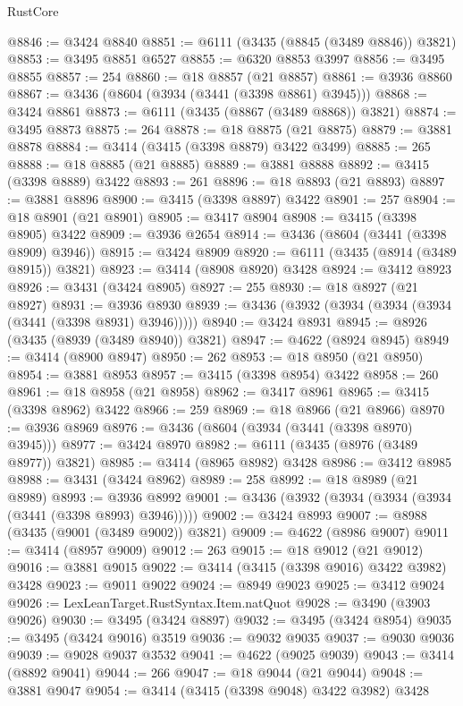 \begin{lexlean}{RustCore}
\begin{coremodule}
@8846 := @3424 @8840
@8851 := @6111 (@3435 (@8845 (@3489 @8846)) @3821)
@8853 := @3495 @8851 @6527
@8855 := @6320 @8853 @3997
@8856 := @3495 @8855
@8857 := 254
@8860 := @18 @8857 (@21 @8857)
@8861 := @3936 @8860
@8867 := @3436 (@8604 (@3934 (@3441 (@3398 @8861) @3945)))
@8868 := @3424 @8861
@8873 := @6111 (@3435 (@8867 (@3489 @8868)) @3821)
@8874 := @3495 @8873
@8875 := 264
@8878 := @18 @8875 (@21 @8875)
@8879 := @3881 @8878
@8884 := @3414 (@3415 (@3398 @8879) @3422 @3499)
@8885 := 265
@8888 := @18 @8885 (@21 @8885)
@8889 := @3881 @8888
@8892 := @3415 (@3398 @8889) @3422
@8893 := 261
@8896 := @18 @8893 (@21 @8893)
@8897 := @3881 @8896
@8900 := @3415 (@3398 @8897) @3422
@8901 := 257
@8904 := @18 @8901 (@21 @8901)
@8905 := @3417 @8904
@8908 := @3415 (@3398 @8905) @3422
@8909 := @3936 @2654
@8914 := @3436 (@8604 (@3441 (@3398 @8909) @3946))
@8915 := @3424 @8909
@8920 := @6111 (@3435 (@8914 (@3489 @8915)) @3821)
@8923 := @3414 (@8908 @8920) @3428
@8924 := @3412 @8923
@8926 := @3431 (@3424 @8905)
@8927 := 255
@8930 := @18 @8927 (@21 @8927)
@8931 := @3936 @8930
@8939 := @3436 (@3932 (@3934 (@3934 (@3934 (@3441 (@3398 @8931) @3946)))))
@8940 := @3424 @8931
@8945 := @8926 (@3435 (@8939 (@3489 @8940)) @3821)
@8947 := @4622 (@8924 @8945)
@8949 := @3414 (@8900 @8947)
@8950 := 262
@8953 := @18 @8950 (@21 @8950)
@8954 := @3881 @8953
@8957 := @3415 (@3398 @8954) @3422
@8958 := 260
@8961 := @18 @8958 (@21 @8958)
@8962 := @3417 @8961
@8965 := @3415 (@3398 @8962) @3422
@8966 := 259
@8969 := @18 @8966 (@21 @8966)
@8970 := @3936 @8969
@8976 := @3436 (@8604 (@3934 (@3441 (@3398 @8970) @3945)))
@8977 := @3424 @8970
@8982 := @6111 (@3435 (@8976 (@3489 @8977)) @3821)
@8985 := @3414 (@8965 @8982) @3428
@8986 := @3412 @8985
@8988 := @3431 (@3424 @8962)
@8989 := 258
@8992 := @18 @8989 (@21 @8989)
@8993 := @3936 @8992
@9001 := @3436 (@3932 (@3934 (@3934 (@3934 (@3441 (@3398 @8993) @3946)))))
@9002 := @3424 @8993
@9007 := @8988 (@3435 (@9001 (@3489 @9002)) @3821)
@9009 := @4622 (@8986 @9007)
@9011 := @3414 (@8957 @9009)
@9012 := 263
@9015 := @18 @9012 (@21 @9012)
@9016 := @3881 @9015
@9022 := @3414 (@3415 (@3398 @9016) @3422 @3982) @3428
@9023 := @9011 @9022
@9024 := @8949 @9023
@9025 := @3412 @9024
@9026 := LexLeanTarget.RustSyntax.Item.natQuot
@9028 := @3490 (@3903 @9026)
@9030 := @3495 (@3424 @8897)
@9032 := @3495 (@3424 @8954)
@9035 := @3495 (@3424 @9016) @3519
@9036 := @9032 @9035
@9037 := @9030 @9036
@9039 := @9028 @9037 @3532
@9041 := @4622 (@9025 @9039)
@9043 := @3414 (@8892 @9041)
@9044 := 266
@9047 := @18 @9044 (@21 @9044)
@9048 := @3881 @9047
@9054 := @3414 (@3415 (@3398 @9048) @3422 @3982) @3428

\end{coremodule}
\end{lexlean}
